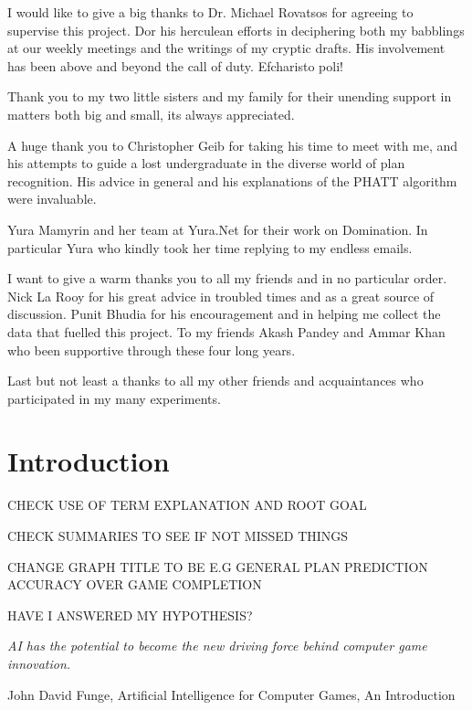 \documentclass[parskip]{cs4rep}
\begin{document}
I would like to give a big thanks to Dr. Michael Rovatsos for agreeing to supervise this project. Dor his herculean efforts in deciphering both my babblings at our weekly meetings and the writings of my cryptic drafts. His involvement has been above and beyond the call of duty. Efcharisto poli!

Thank you to my two little sisters and my family for their unending support in matters both big and small, its always appreciated. 

A huge thank you to Christopher Geib for taking his time to meet with me, and his attempts to guide a lost undergraduate in the diverse world of plan recognition. His advice in general and his explanations of the PHATT algorithm were invaluable. 

Yura Mamyrin and her team at Yura.Net for their work on Domination. In particular Yura who kindly took her time replying to my endless emails.

I want to give a warm thanks you to all my friends and in no particular order. Nick La Rooy for his great advice in troubled times and as a great source of discussion. Punit Bhudia for his encouragement and in helping me collect the data that fuelled this project. To my friends Akash Pandey and Ammar Khan who been supportive through these four long years. 

Last but not least a thanks to all my other friends and acquaintances who participated in my many experiments.

\tableofcontents


\chapter{Introduction}

CHECK USE OF TERM EXPLANATION AND ROOT GOAL

CHECK SUMMARIES TO SEE IF NOT MISSED THINGS

CHANGE GRAPH TITLE TO BE E.G GENERAL PLAN PREDICTION ACCURACY OVER GAME COMPLETION

HAVE I ANSWERED MY HYPOTHESIS?

\begin{flushleft}
\textit{AI has the potential to become the new driving force behind computer game innovation.}
\end{flushleft}
\begin{flushleft}
John David Funge, Artificial Intelligence for Computer Games, An Introduction
\end{flushleft}
\end{document}
